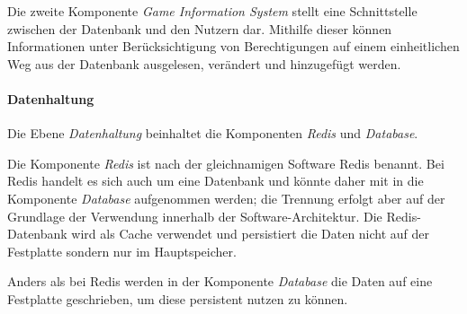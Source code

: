 Die zweite Komponente \textit{Game Information System} stellt eine Schnittstelle zwischen der Datenbank und den Nutzern dar. Mithilfe dieser können Informationen unter Berücksichtigung von Berechtigungen auf einem einheitlichen Weg aus der Datenbank ausgelesen, verändert und hinzugefügt werden. 

\paragraph{Datenhaltung}
Die Ebene \textit{Datenhaltung} beinhaltet die Komponenten \textit{Redis} und \textit{Database}. 

Die Komponente \textit{Redis} ist nach der gleichnamigen Software Redis benannt. Bei Redis handelt es sich auch um eine Datenbank und könnte daher mit in die Komponente \textit{Database} aufgenommen werden; die Trennung erfolgt aber auf der Grundlage der Verwendung innerhalb der Software-Architektur. Die Redis-Datenbank wird als Cache verwendet und persistiert die Daten nicht auf der Festplatte sondern nur im Hauptspeicher.

Anders als bei Redis werden in der Komponente \textit{Database} die Daten auf eine Festplatte geschrieben, um diese persistent nutzen zu können.